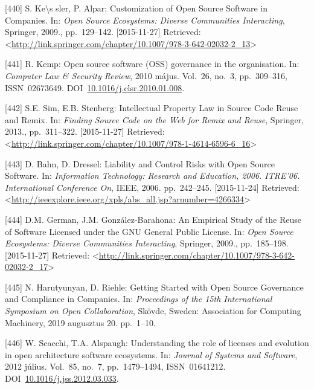 \documentclass[12pt,magyar,a4paper,oneside]{scrreprt}
\newenvironment{cslreferences}%
  {}%
  {\par}
\begin{document}
\begin{cslreferences}
\leavevmode\hypertarget{ref-kes_sler_customization_2009}{}%
{[}440{]} S. Ke\textbackslash s sler, P. Alpar: Customization of Open
Source Software in Companies. In: \emph{Open Source Ecosystems: Diverse
Communities Interacting}, Springer, 2009., pp.~129--142.
{[}2015-11-27{]} Retrieved:
\textless{}\url{http://link.springer.com/chapter/10.1007/978-3-642-02032-2_13}\textgreater{}

\leavevmode\hypertarget{ref-kemp_open_2010}{}%
{[}441{]} R. Kemp: Open source software (OSS) governance in the
organisation. In: \emph{Computer Law \& Security Review}, 2010 május.
Vol.~26, no.~3, pp.~309--316, ISSN~02673649.
DOI~\href{https://doi.org/10.1016/j.clsr.2010.01.008}{10.1016/j.clsr.2010.01.008}.

\leavevmode\hypertarget{ref-sim_intellectual_2013}{}%
{[}442{]} S.E. Sim, E.B. Stenberg: Intellectual Property Law in Source
Code Reuse and Remix. In: \emph{Finding Source Code on the Web for Remix
and Reuse}, Springer, 2013., pp.~311--322. {[}2015-11-27{]} Retrieved:
\textless{}\url{http://link.springer.com/chapter/10.1007/978-1-4614-6596-6_16}\textgreater{}

\leavevmode\hypertarget{ref-bahn_liability_2006}{}%
{[}443{]} D. Bahn, D. Dressel: Liability and Control Risks with Open
Source Software. In: \emph{Information Technology: Research and
Education, 2006. ITRE'06. International Conference On}, IEEE, 2006.
pp.~242--245. {[}2015-11-24{]} Retrieved:
\textless{}\url{http://ieeexplore.ieee.org/xpls/abs_all.jsp?arnumber=4266334}\textgreater{}

\leavevmode\hypertarget{ref-german_empirical_2009}{}%
{[}444{]} D.M. German, J.M. González-Barahona: An Empirical Study of the
Reuse of Software Licensed under the GNU General Public License. In:
\emph{Open Source Ecosystems: Diverse Communities Interacting},
Springer, 2009., pp.~185--198. {[}2015-11-27{]} Retrieved:
\textless{}\url{http://link.springer.com/chapter/10.1007/978-3-642-02032-2_17}\textgreater{}

\leavevmode\hypertarget{ref-harutyunyan_getting_2019}{}%
{[}445{]} N. Harutyunyan, D. Riehle: Getting Started with Open Source
Governance and Compliance in Companies. In: \emph{Proceedings of the
15th International Symposium on Open Collaboration}, Skövde, Sweden:
Association for Computing Machinery, 2019 augusztus 20. pp.~1--10.

\leavevmode\hypertarget{ref-scacchi_understanding_2012}{}%
{[}446{]} W. Scacchi, T.A. Alspaugh: Understanding the role of licenses
and evolution in open architecture software ecosystems. In:
\emph{Journal of Systems and Software}, 2012 július. Vol.~85, no.~7,
pp.~1479--1494, ISSN~01641212.
DOI~\href{https://doi.org/10.1016/j.jss.2012.03.033}{10.1016/j.jss.2012.03.033}.


\end{cslreferences}
\end{document}
